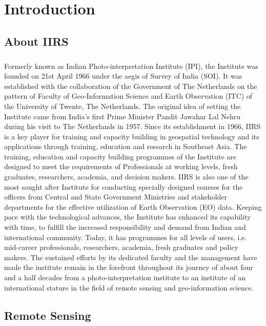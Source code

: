 \documentclass[12pt, a4paper]{report}
\begin{document}
\tableofcontents
\listoffigures

\setcounter{page}{1}
\setcounter{secnumdepth}{1}
\chapter{Introduction}
\section{About IIRS}
\paragraph{}
Formerly known as Indian Photo-interpretation Institute (IPI), the Institute was founded on 21st April 1966 under the aegis of Survey of India (SOI). It was established with the collaboration of the Government of The Netherlands on the pattern of Faculty of Geo-Information Science and Earth Observation (ITC) of the University of Twente, The Netherlands. The original idea of setting the Institute came from India's first Prime Minister Pandit Jawahar Lal Nehru during his visit to The Netherlands in 1957. Since its establishment in 1966, IIRS is a key player for training and capacity building in geospatial technology and its applications through training, education and research in Southeast Asia. The training, education and capacity building programmes of the Institute are designed to meet the requirements of Professionals at working levels, fresh graduates, researchers, academia, and decision makers. IIRS is also one of the most sought after Institute for conducting specially designed courses for the officers from Central and State Government Ministries and stakeholder departments for the effective utilization of Earth Observation (EO) data. Keeping pace with the technological advances, the Institute has enhanced its capability with time, to fulfill the increased responsibility and demand from Indian and international community. Today, it has programmes for all levels of users, i.e. mid-career professionals, researchers, academia, fresh graduates and policy makers. The sustained efforts by its dedicated faculty and the management have made the institute remain in the forefront throughout its journey of about four and a half decades from a photo-interpretation institute to an institute of an international stature in the field of remote sensing and geo-information science.\cite{iirs.about.history}\cite{iirs.about.instiprof}
\section{Remote Sensing}
\end{document}
